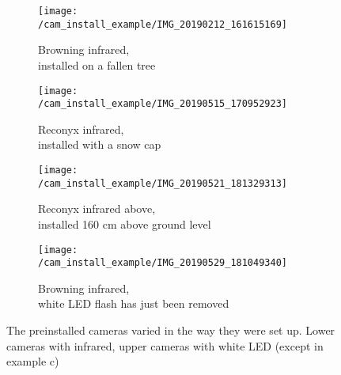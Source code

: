 \begin{figure}
		\begin{subfigure}{.5\textwidth}
		  \centering
		  	\texttt{[image: /cam\_install\_example/IMG\_20190212\_161615169]}
		  \caption{Browning infrared,\\ installed on a fallen tree}
		  	\label{fig:cam_ex_a}
	\end{subfigure}
		\begin{subfigure}{.5\textwidth}
		  \centering
		  	\texttt{[image: /cam\_install\_example/IMG\_20190515\_170952923]}
		  \caption{Reconyx infrared,\\ installed with a snow cap}
		  	\label{fig:cam_ex_b}
	\end{subfigure}
		\begin{subfigure}{.5\textwidth}
		  \centering
		  	\texttt{[image: /cam\_install\_example/IMG\_20190521\_181329313]}
		  \caption{Reconyx infrared above,\\ installed 160 cm above ground level}
		  	\label{fig:cam_ex_c}
	\end{subfigure}
		\begin{subfigure}{.5\textwidth}
		  \centering
		  	\texttt{[image: /cam\_install\_example/IMG\_20190529\_181049340]}
		  \caption{Browning infrared,\\ white LED flash has just been removed}
		  	\label{fig:cam_ex_d}
	\end{subfigure}
		\caption{The preinstalled cameras varied in the way they were set up. Lower cameras with infrared, upper cameras with white LED (except in example c)}
	\label{fig:cam_ex_main}
\end{figure}




